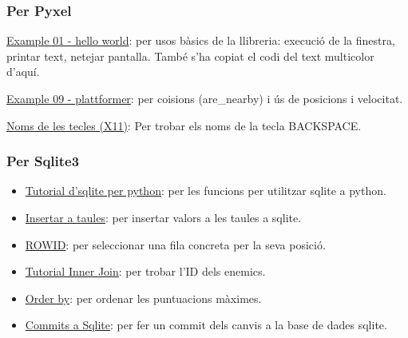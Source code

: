 \subsubsection*{Per Pyxel}

\begin{itemize}
\begin{item}
\href{https://raw.githubusercontent.com/kitao/pyxel/main/python/pyxel/examples/01_hello_pyxel.py}
{Example 01 - hello world}:
per usos b\`asics de la llibreria:
execuci\'o de la finestra, printar text, netejar pantalla.
Tamb\'e s'ha copiat el codi del text multicolor d'aqu\'i.
\end{item}

\begin{item}
\href{https://raw.githubusercontent.com/kitao/pyxel/main/python/pyxel/examples/10_platformer.py}
{Example 09 - plattformer}:
per co\lgem isions (are\_nearby) i \'us de posicions i velocitat.
\end{item}

\begin{item}
\href{http://xahlee.info/linux/linux_show_keycode_keysym.html}
{Noms de les tecles (X11)}:
Per trobar els noms de la tecla BACKSPACE.
\end{item}
\end{itemize}



\subsubsection*{Per Sqlite3}
\begin{itemize}
\item{\href{https://pynative.com/python-sqlite/}
{Tutorial d'sqlite per python}}:
per les funcions per utilitzar sqlite a python.

\item{\href{https://www.sqlite.org/lang_insert.html}
{Insertar a taules}}:
per insertar valors a les taules a sqlite.

\item{\href{https://sqlite.org/rowidtable.html}
{ROWID}}:
per seleccionar una fila concreta per la seva posici\'o.

\item{\href{https://www.sqlitetutorial.net/sqlite-inner-join/}
{Tutorial Inner Join}}:
per trobar l'ID dels enemics.

\item{\href{https://www.sqlitetutorial.net/sqlite-order-by/}
{Order by}}:
per ordenar les puntuacions m\`aximes.

\item{\href{https://stackoverflow.com/questions/26691504/python-sqlite3-data-is-not-saved-permanently}
{Commits a Sqlite}}:
per fer un commit dels canvis a la base de dades sqlite.

\end{itemize}

